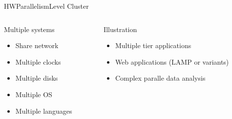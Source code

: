 %
\begin{Frame}{HWParallelismLevel Cluster}
  \begin{columns}[t]
    \begin{column}{\HW} %
      \begin{block}{Multiple systems}
        \begin{itemize}
        \item Share network
        \item Multiple clocks
        \item Multiple disks
        \item Multiple OS
        \item Multiple languages
        \end{itemize}
      \end{block} 
    \end{column}
    
    \begin{column}{\HW} %
      \begin{block}{Illustration}
        \begin{itemize}
        \item Multiple tier applications
        \item Web applications (LAMP or variants)
        \item Complex paralle data analysis
        \end{itemize}
      \end{block}   
    \end{column}
  \end{columns}  
\end{Frame}


